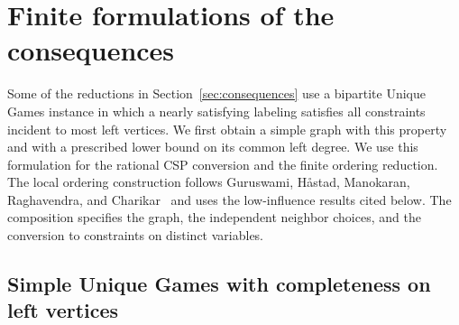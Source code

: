 \section{Finite formulations of the consequences}
\label{app:finite-consequences}

Some of the reductions in Section~\ref{sec:consequences} use a bipartite
Unique Games instance in which a nearly satisfying labeling satisfies
all constraints incident to most left vertices.  We first obtain a simple
graph with this property and with a prescribed lower bound on its common
left degree.  We use this formulation for the rational CSP conversion
and the finite ordering reduction.  The local ordering construction follows
Guruswami, H\aa stad, Manokaran, Raghavendra, and
Charikar~\cite{GuruswamiEtAl2011OrderingCSP} and uses the
low-influence results cited below.  The composition specifies the graph,
the independent neighbor choices, and the conversion to constraints on distinct
variables.

\subsection{Simple Unique Games with completeness on left vertices}\label{subsec:left-vertex-completeness-proof}


